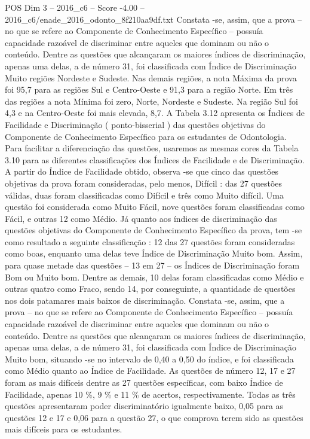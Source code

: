 \begin{textsample}{POS Dim 3 – 2016\_c6 – Score -4.00 – 2016\_c6/enade\_2016\_odonto\_8f210aa9df.txt}
Constata -se, assim, que a prova – no que se refere ao Componente de Conhecimento Específico – possuía capacidade razoável de discriminar entre aqueles que dominam ou não o conteúdo.
Dentre as questões que alcançaram os maiores índices de discriminação, apenas uma delas, a de número 31, foi classificada com Índice de Discriminação Muito regiões Nordeste e Sudeste.
Nas demais regiões, a nota Máxima da prova foi 95,7 para as regiões Sul e Centro-Oeste e 91,3 para a região Norte.
Em três das regiões a nota Mínima foi zero, Norte, Nordeste e Sudeste.
Na região Sul foi 4,3 e na Centro-Oeste foi mais elevada, 8,7.
A Tabela 3.12 apresenta os Índices de Facilidade e Discriminação ( ponto-bisserial ) das questões objetivas do Componente de Conhecimento Específico para os estudantes de Odontologia.
Para facilitar a diferenciação das questões, usaremos as mesmas cores da Tabela 3.10 para as diferentes classificações dos Índices de Facilidade e de Discriminação.
A partir do Índice de Facilidade obtido, observa -se que cinco das questões objetivas da prova foram consideradas, pelo menos, Difícil : das 27 questões válidas, duas foram classificadas como Difícil e três como Muito difícil.
Uma questão foi considerada como Muito Fácil, nove questões foram classificadas como Fácil, e outras 12 como Médio.
Já quanto aos índices de discriminação das questões objetivas do Componente de Conhecimento Específico da prova, tem -se como resultado a seguinte classificação : 12 das 27 questões foram consideradas como boas, enquanto uma delas teve Índice de Discriminação Muito bom.
Assim, para quase metade das questões – 13 em 27 – os Índices de Discriminação foram Bom ou Muito bom.
Dentre as demais, 10 delas foram classificadas como Médio e outras quatro como Fraco, sendo 14, por conseguinte, a quantidade de questões nos dois patamares mais baixos de discriminação.
Constata -se, assim, que a prova – no que se refere ao Componente de Conhecimento Específico – possuía capacidade razoável de discriminar entre aqueles que dominam ou não o conteúdo.
Dentre as questões que alcançaram os maiores índices de discriminação, apenas uma delas, a de número 31, foi classificada com Índice de Discriminação Muito bom, situando -se no intervalo de 0,40 a 0,50 do índice, e foi classificada como Médio quanto ao Índice de Facilidade.
As questões de número 12, 17 e 27 foram as mais difíceis dentre as 27 questões específicas, com baixo Índice de Facilidade, apenas 10 \%, 9 \% e 11 \% de acertos, respectivamente.
Todas as três questões apresentaram poder discriminatório igualmente baixo, 0,05 para as questões 12 e 17 e 0,06 para a questão 27, o que comprova terem sido as questões mais difíceis para os estudantes.

\end{textsample}
